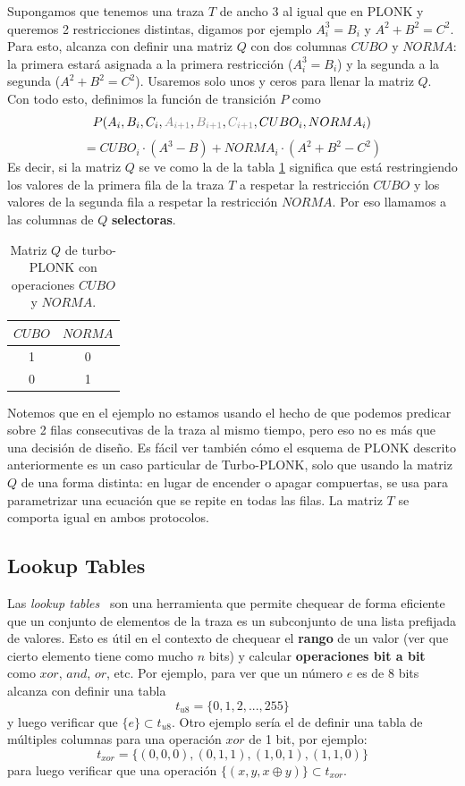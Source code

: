 Supongamos que tenemos una traza $T$ de ancho $3$ al igual que en PLONK y queremos 2 restricciones distintas, digamos por ejemplo $A_i^3=B_i$ y $A^2+B^2 =C^2$. Para esto, alcanza con definir una matriz $Q$ con dos columnas $CUBO$ y $NORMA$: la primera estará asignada a la primera restricción ($A_i^3=B_i$) y la segunda a la segunda ($A^2+B^2=C^2$). Usaremos solo unos y ceros para llenar la matriz $Q$. Con todo esto, definimos la función de transición $P$ como
$$P(A_i, B_i, C_i, \textcolor{gray}{A_{i+1}}, \textcolor{gray}{B_{i+1}}, \textcolor{gray}{C_{i+1}}, CUBO_i, NORMA_i) $$$$ = CUBO_i \cdot (A^3-B) + NORMA_i\cdot (A^2+B^2 - C^2)$$
Es decir, si la matriz $Q$ se ve como la de la tabla \ref{tab:Q_turbo_plonk} significa que está restringiendo los valores de la primera fila de la traza $T$ a respetar la restricción $CUBO$ y los valores de la segunda fila a respetar la restricción $NORMA$. Por eso llamamos a las columnas de $Q$ \textbf{selectoras}.
\begin{table}[H]
\begin{center}
\begin{tabular}{cc}
\toprule
$CUBO$ & $NORMA$ \\
\midrule
1 & 0 \\
0 & 1 \\

\bottomrule
\end{tabular}
\caption{Matriz $Q$ de turbo-PLONK con operaciones $CUBO$ y $NORMA$.}
\label{tab:Q_turbo_plonk}
\end{center}
\end{table}

Notemos que en el ejemplo no estamos usando el hecho de que podemos predicar sobre 2 filas consecutivas de la traza al mismo tiempo, pero eso no es más que una decisión de diseño. Es fácil ver también cómo el esquema de PLONK descrito anteriormente es un caso particular de Turbo-PLONK, solo que usando la matriz $Q$ de una forma distinta: en lugar de encender o apagar compuertas, se usa para parametrizar una ecuación que se repite en todas las filas. La matriz $T$ se comporta igual en ambos protocolos. 

\subsection{Lookup Tables}\label{sec:plonk_lookup_tables}

Las \textit{lookup tables}~\cite{gabizon2020plookup} son una herramienta que permite chequear de forma eficiente que un conjunto de elementos de la traza es un subconjunto de una lista prefijada de valores. Esto es útil en el contexto de chequear el \textbf{rango} de un valor (ver que cierto elemento tiene como mucho $n$ bits) y calcular \textbf{operaciones bit a bit} como $xor$, $and$, $or$, etc. Por ejemplo, para ver que un número $e$ es de 8 bits alcanza con definir una tabla
$$t_{u8} = \{0,1,2,..., 255\}$$
y luego verificar que $\{e\} \subset t_{u8}$. Otro ejemplo sería el de definir una tabla de múltiples columnas para una operación $xor$ de 1 bit, por ejemplo:
$$t_{xor} = \{(0,0,0),(0,1,1),(1,0,1),(1,1,0)\}$$
para luego verificar que una operación $\{(x,y,x\oplus y)\} \subset t_{xor}$. 

